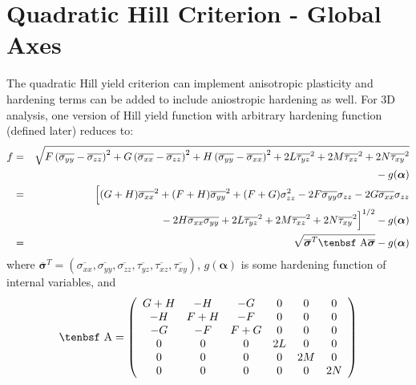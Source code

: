 \documentclass[11pt]{book}
\renewcommand{\vec}[1]{\boldsymbol{#1}}
\def\A{\hbox{\tenbsf A}}
\def\s#1{\sigma_{#1}}
\def\t#1{\tau_{#1}}
\begin{document}
\section{Quadratic Hill Criterion - Global Axes}

The quadratic Hill yield criterion can implement anisotropic plasticity and hardening terms can be added to include aniostropic hardening as well. For 3D analysis, one version of Hill yield function with arbitrary hardening function (defined later) reduces to:
\begin{eqnarray}
          f & = & \sqrt{F\left(\overline{\s{yy}}- \overline{\s{zz}}\right)^2 + G\left(\overline{\s{xx}}- \overline{\s{zz}}\right)^2
               + H\left(\overline{\s{yy}}- \overline{\s{xx}}\right)^2 +2L\overline{\t{yz}}^2 +2M\overline{\t{xz}}^2
                 +2N\overline{\t{xy}}^2}
  \nonumber\\
 &&\qquad\mbox{}
                 - g(\vec\alpha) \\
             & = & \Bigl[(G+H)\overline{\s{xx}}^2  + (F+H)\overline{\s{yy}}^2 + (F+G)\s{zz}^2
                   -2F \overline{\s{yy}}\s{zz} - 2G \overline{\s{xx}}\s{zz}
 \nonumber\\
 &&\qquad\mbox{}
                    - 2H \overline{\s{xx}}\overline{\s{yy}}
                   +2L\overline{\t{yz}}^2 +2M\overline{\t{xz}}^2+2N\overline{\t{xy}}^2\Bigr]^{1/2}  - g(\vec\alpha) \\
             & = & \sqrt{\overline{\vec\sigma}^T\A \overline{\vec\sigma}} - g(\vec\alpha)       \label{froteq}
\end{eqnarray}
where $\overline{\vec\sigma}^T = (\overline{\s{xx}}, \overline{\s{yy}}, \overline{\s{zz}}, \overline{\t{yz}}, \overline{\t{xz}}, \overline{\t{xy}})$, $g(\vec\alpha)$ is some hardening function of internal variables, and
\begin{equation}
      \A = \left( \begin{array}{cccccc}
                       G+H & -H & -G & 0 & 0 & 0 \\
                       -H & F+H & -F & 0 & 0 & 0\\
                       -G & -F & F+G & 0 & 0 & 0\\
                        0 & 0 & 0 & 2L & 0 & 0 \\
                       0 & 0 & 0 & 0 & 2M & 0 \\
                      0 & 0 & 0 & 0 & 0 & 2N
                       \end{array} \right)
\end{equation}
\end{document}
